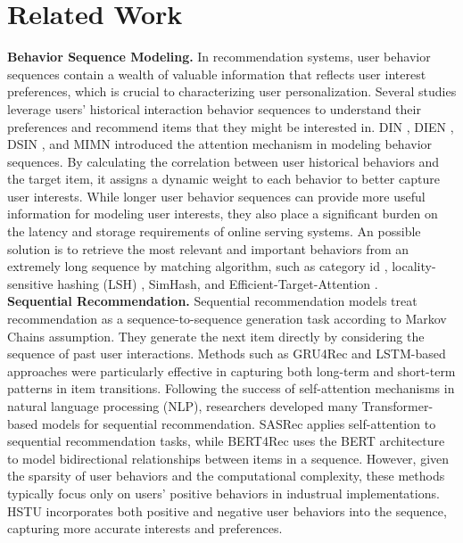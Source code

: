 \section{Related Work}
\textbf{Behavior Sequence Modeling.} 
In recommendation systems, user behavior sequences contain a wealth of valuable information that reflects user interest preferences, which is crucial to characterizing user personalization. Several studies leverage users' historical interaction behavior sequences to understand their preferences and recommend items that they might be interested in.
DIN \cite{zhou2018din}, DIEN \cite{zhou2019dien}, DSIN \cite{feng2019dsin}, and MIMN \cite{pi2019mimn} introduced the attention mechanism in modeling behavior sequences. By calculating the correlation between user historical behaviors and the target item, it assigns a dynamic weight to each behavior to better capture user interests. 
While longer user behavior sequences can provide more useful information for modeling user interests, they also place a significant burden on the latency and storage requirements of online serving systems. An possible solution is to retrieve the most relevant and important behaviors from an extremely long sequence by matching algorithm, such as category id \cite{pi2020search}, locality-sensitive hashing (LSH) \cite{chen2021end}, SimHash\cite{cao2022sampling}, and Efficient-Target-Attention \cite{chang2023twin}. \\

\noindent \textbf{Sequential Recommendation.}
Sequential recommendation models treat recommendation as a sequence-to-sequence generation task according to Markov Chains assumption.
They generate the next item directly by considering the sequence of past user interactions. 
Methods such as GRU4Rec \cite{hidasi2018gru4rec} and LSTM-based approaches \cite{wu2017recurrent} were particularly effective in capturing both long-term and short-term patterns in item transitions. Following the success of self-attention mechanisms \cite{waswani2017transformer} in natural language processing (NLP), researchers developed many Transformer-based models for sequential recommendation. SASRec \cite{kang2018self} applies self-attention to sequential recommendation tasks, while BERT4Rec\cite{sun2019bert4rec} uses the BERT architecture to model bidirectional relationships between items in a sequence. However, given the sparsity of user behaviors and the computational complexity, these methods typically focus only on users' positive behaviors in industrual implementations.
HSTU \cite{zhai24hstu} incorporates both positive and negative user behaviors into the sequence, capturing more accurate interests and preferences. 
\\



